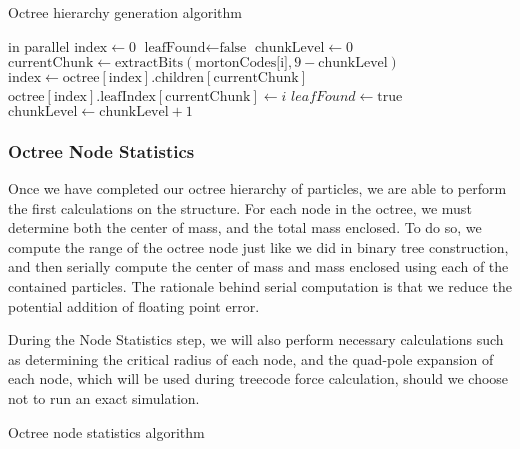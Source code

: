 \documentclass{thesis}
\begin{document}

\begin{algorithm}
    \label{alg:LinkOctree}
    \caption{Octree hierarchy generation algorithm}
    \begin{algorithmic}
         in parallel
            \State $\text{index} \gets 0$
            \State $\text{leafFound} \gets \text{false}$
            \State $\text{chunkLevel} \gets 0$
                \State $\text{currentChunk} \gets \text{extractBits}(\text{mortonCodes[i]}, 9 - \text{chunkLevel})$
                    \State $\text{index} \gets \text{octree}[\text{index}].\text{children}[\text{currentChunk}]$
                \Else
                    \State $\text{octree}[\text{index}].\text{leafIndex}[\text{currentChunk}] \gets i$
                    \State $leafFound \gets \text{true}$
                \EndIf
                \State $\text{chunkLevel} \gets \text{chunkLevel} + 1$
            \EndWhile
        \EndFor
    \end{algorithmic}
\end{algorithm}
\subsubsection{Octree Node Statistics}
Once we have completed our octree hierarchy of particles, we are able to perform the first calculations on the structure. For each node in the octree, we must determine both the center of mass, and the total mass enclosed. To do so, we compute the range of the octree node just like we did in binary tree construction, and then serially compute the center of mass and mass enclosed using each of the contained particles. The rationale behind serial computation is that we reduce the potential addition of floating point error.

During the Node Statistics step, we will also perform necessary calculations such as determining the critical radius of each node, and the quad-pole expansion of each node, which will be used during treecode force calculation, should we choose not to run an exact simulation.

\begin{algorithm}
    \label{alg:OctreeNodeStats}
    \caption{Octree node statistics algorithm}
    \begin{algorithmic}
        \EndFor
    \end{algorithmic}
\end{algorithm}
\end{document}
